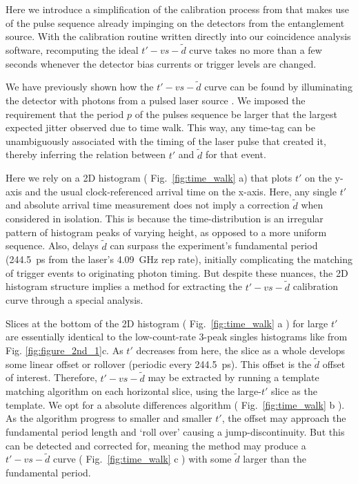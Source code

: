 \documentclass[11pt]{caltech_thesis} %
\begin{document}
Here we introduce a simplification of the calibration process from \autocite{Mueller2023} that makes use of the pulse sequence already impinging on the detectors from the entanglement source. With the calibration routine written directly into our coincidence analysis software, recomputing the ideal $t'-vs-\tilde{d}$ curve takes no more than a few seconds whenever the detector bias currents or trigger levels are changed.

We have previously shown how the $t'-vs-\tilde{d}$ curve can be found by illuminating the detector with photons from a pulsed laser source \autocite{Mueller2023}. We imposed the requirement that the period $p$ of the pulses sequence be larger that the largest expected jitter observed due to time walk. This way, any time-tag can be unambiguously associated with the timing of the laser pulse that created it, thereby inferring the relation between $t'$ and $\tilde{d}$ for that event.

Here we rely on a 2D histogram ( Fig.~\ref{fig:time_walk} a) that plots $t'$ on the y-axis and the usual clock-referenced arrival time on the x-axis. Here, any single $t'$ and absolute arrival time measurement does not imply a correction $\tilde{d}$ when considered in isolation. This is because the time-distribution is an irregular pattern of histogram peaks of varying height, as opposed to a more uniform sequence. Also, delays $\tilde{d}$ can surpass the experiment's fundamental period (244.5~ps from the laser's 4.09~GHz rep rate), initially complicating the matching of trigger events to originating photon timing. But despite these nuances, the 2D histogram structure implies a method for extracting the $t'-vs-\tilde{d}$ calibration curve through a special analysis.

Slices at the bottom of the 2D histogram ( Fig.~\ref{fig:time_walk} a ) for large $t'$ are essentially identical to the low-count-rate 3-peak singles histograms like from Fig. \ref{fig:figure_2nd_1}c. As $t'$ decreases from here, the slice as a whole develops some linear offset or rollover (periodic every 244.5~ps). This offset is the $\tilde{d}$ offset of interest. Therefore, $t'-vs-\tilde{d}$ may be extracted by running a template matching algorithm on each horizontal slice, using the large-$t'$ slice as the template. We opt for a absolute differences algorithm ( Fig.~\ref{fig:time_walk} b ). As the algorithm progress to smaller and smaller $t'$, the offset may approach the fundamental period length and `roll over' causing a jump-discontinuity. But this can be detected and corrected for, meaning the method may produce a $t'-vs-\tilde{d}$ curve ( Fig.~\ref{fig:time_walk} c ) with some $\tilde{d}$ larger than the fundamental period.
\end{document}
